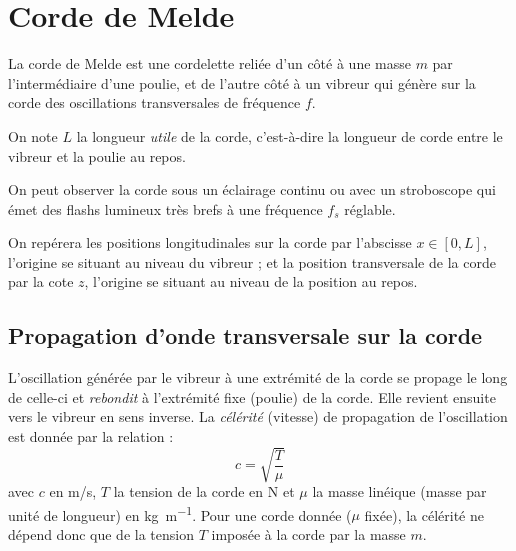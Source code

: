 \documentclass[]{tp}
\begin{document}


\section{Corde de Melde}%
\label{sec:corde_de_melde}
La corde de Melde est une cordelette reliée d’un côté à une masse $m$ par l'intermédiaire d’une poulie, et de l’autre côté à un vibreur qui génère sur la corde des oscillations transversales de fréquence $f$. 

On note $L$ la longueur \emph{utile}  de la corde, c’est-à-dire la longueur de corde entre le vibreur et la poulie au repos.

On peut observer la corde sous un éclairage continu ou avec un stroboscope qui émet des flashs lumineux très brefs à une fréquence $f_s$ réglable. 

On repérera les positions longitudinales sur la corde par l’abscisse $x\in [0,L]$, l'origine se situant au niveau du vibreur ; et la position transversale de la corde par la cote $z$, l'origine se situant au niveau de la position au repos.

\begin{center}
\end{center}

\subsection{Propagation d'onde transversale sur la corde}%
\label{sub:propagation_d_onde_transversale_sur_la_corde}

L'oscillation générée par le vibreur à une extrémité de la corde se propage le long de celle-ci et \emph{rebondit} à l'extrémité fixe (poulie) de la corde. Elle revient ensuite vers le vibreur en sens inverse. La \emph{célérité} (vitesse) de propagation de l'oscillation est donnée par la relation : 
%
\[c = \sqrt{\frac{T}{\mu}}\] 
%
avec $c$ en \si{m/s}, $T$ la tension de la corde en N et $\mu$ la masse linéique (masse par unité de longueur) en \si{kg\per\meter}. Pour une corde donnée ($\mu$ fixée), la célérité ne dépend donc que de la tension $T$ imposée à la corde par la masse $m$.
\end{document}
